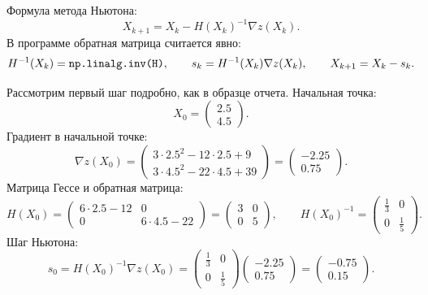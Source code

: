 \documentclass[12pt,a4paper]{article}
\begin{document}
Формула метода Ньютона:
\begin{equation}
  X_{k+1}=X_k-H(X_k)^{-1}\nabla z(X_k).
\end{equation}
В программе обратная матрица считается явно:
\begin{equation}
  H^{-1}(X_k)=\text{\texttt{np.linalg.inv(H)}}, \qquad
  s_k=H^{-1}(X_k)\nabla z(X_k), \qquad
  X_{k+1}=X_k-s_k.
\end{equation}

Рассмотрим первый шаг подробно, как в образце отчета. Начальная точка:
\begin{equation}
  X_0=\begin{pmatrix}2.5\\4.5\end{pmatrix}.
\end{equation}
Градиент в начальной точке:
\begin{equation}
  \nabla z(X_0)=
  \begin{pmatrix}
    3\cdot 2.5^2-12\cdot 2.5+9\\
    3\cdot 4.5^2-22\cdot 4.5+39
  \end{pmatrix}
  =
  \begin{pmatrix}
    -2.25\\
    0.75
  \end{pmatrix}.
\end{equation}
Матрица Гессе и обратная матрица:
\begin{equation}
  H(X_0)=
  \begin{pmatrix}
    6\cdot 2.5-12 & 0\\
    0 & 6\cdot 4.5-22
  \end{pmatrix}
  =
  \begin{pmatrix}
    3 & 0\\
    0 & 5
  \end{pmatrix},
  \qquad
  H(X_0)^{-1}=
  \begin{pmatrix}
    \frac{1}{3} & 0\\
    0 & \frac{1}{5}
  \end{pmatrix}.
\end{equation}
Шаг Ньютона:
\begin{equation}
  s_0=H(X_0)^{-1}\nabla z(X_0)=
  \begin{pmatrix}
    \frac{1}{3} & 0\\
    0 & \frac{1}{5}
  \end{pmatrix}
  \begin{pmatrix}
    -2.25\\
    0.75
  \end{pmatrix}
  =
  \begin{pmatrix}
    -0.75\\
    0.15
  \end{pmatrix}.
\end{equation}
\end{document}
